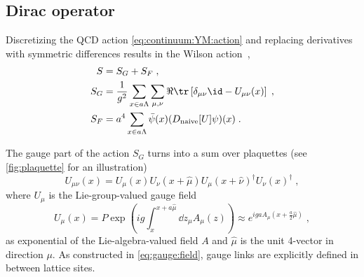 \subsection{Dirac operator}

Discretizing the QCD action \cref{eq:continuum:YM:action} and replacing derivatives with symmetric differences results in the Wilson action~\cite{Gattringer:2010zz},
\begin{align}
S &= S_G + S_F \;, \\
S_G &= \frac{1}{g^2} \sum_{x \in a \Lambda} \sum_{\mu, \nu} \Re \tr \left[ \delta_{\mu \nu} \id - U_{\mu \nu}(x) \right] \;, \label{eq:wilson:action:gauge} \\
S_F &= a^4 \sum_{x \in a \Lambda} \bar{\psi}(x) (D_{\text{naive}}[U] \psi)(x) \;.
\end{align}

The gauge part of the action $S_G$ turns into a sum over plaquettes (see \cref{fig:plaquette} for an illustration)
\begin{equation} \label{eq:plaquette}
U_{\mu \nu}(x)
= U_{\mu}(x) U_{\nu}(x + \hat{\mu}) U_{\mu}(x + \hat{\nu})^{\dagger} U_{\nu}(x)^{\dagger} \;,
\end{equation}
where $U_{\mu}$ is the Lie-group-valued gauge field
\begin{equation} \label{eq:gauge:field}
U_{\mu}(x)
= P \exp(i g \int_x^{x + a \hat{\mu}} \dd z_{\mu} A_{\mu}(z) )
\approx e^{i g a A_{\mu}(x + \frac{a}{2} \hat{\mu})} \;,
\end{equation}
as exponential of the Lie-algebra-valued field $A$ and $\hat{\mu}$ is the unit 4-vector in direction $\mu$.
As constructed in \cref{eq:gauge:field}, gauge links are explicitly defined in between lattice sites.

